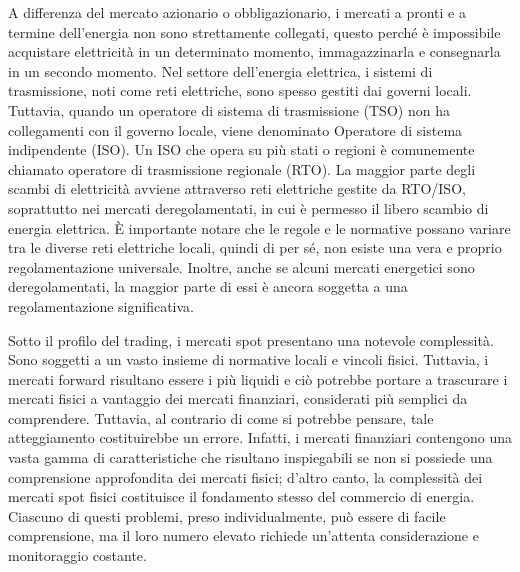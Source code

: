 \documentclass[12pt,a4paper]{report}
\begin{document}
A differenza del mercato azionario o obbligazionario, i mercati a pronti e a termine dell'energia non sono strettamente collegati, questo perché è impossibile acquistare elettricità in un determinato momento, immagazzinarla e consegnarla in un secondo momento.
Nel settore dell'energia elettrica, i sistemi di trasmissione, noti come reti elettriche, sono spesso gestiti dai governi locali. Tuttavia, quando un operatore di sistema di trasmissione (TSO) non ha collegamenti con il governo locale, viene denominato Operatore di sistema indipendente (ISO). Un ISO che opera su più stati o regioni è comunemente chiamato operatore di trasmissione regionale (RTO). La maggior parte degli scambi di elettricità avviene attraverso reti elettriche gestite da RTO/ISO, soprattutto nei mercati deregolamentati, in cui è permesso il libero scambio di energia elettrica. È importante notare che le regole e le normative possano variare tra le diverse reti elettriche locali, quindi di per sé, non esiste una vera e proprio regolamentazione universale. Inoltre, anche se alcuni mercati energetici sono deregolamentati, la maggior parte di essi è ancora soggetta a una regolamentazione significativa.

Sotto il profilo del trading, i mercati spot presentano una notevole complessità. Sono soggetti a un vasto insieme di normative locali e vincoli fisici. Tuttavia, i mercati forward risultano essere i più liquidi e ciò potrebbe portare a trascurare i mercati fisici a vantaggio dei mercati finanziari, considerati più semplici da comprendere. Tuttavia, al contrario di come si potrebbe pensare, tale atteggiamento costituirebbe un errore. Infatti, i mercati finanziari contengono una vasta gamma di caratteristiche che risultano inspiegabili se non si possiede una comprensione approfondita dei mercati fisici; d'altro canto, la complessità dei mercati spot fisici costituisce il fondamento stesso del commercio di energia. Ciascuno di questi problemi, preso individualmente, può essere di facile comprensione, ma il loro numero elevato richiede un'attenta considerazione e monitoraggio costante.
\end{document}
